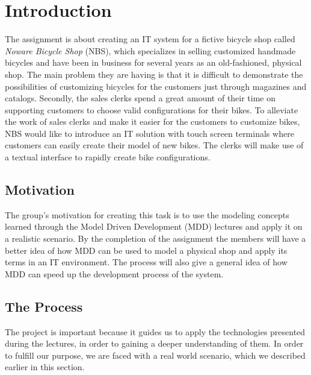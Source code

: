 \section{Introduction}
\label{sec.introduction}
\noindent The assignment is about creating an IT system for a fictive bicycle
shop called \emph{Noware Bicycle Shop} (NBS), which specializes in selling
customized handmade bicycles and have been in business for several years as an
old-fashioned, physical shop. The main problem they are having is that it is
difficult to demonstrate the possibilities of customizing bicycles for the
customers just through magazines and catalogs. Secondly, the sales clerks spend
a great amount of their time on supporting customers to choose valid
configurations for their bikes. To alleviate the work of sales clerks and make
it easier for the customers to customize bikes, NBS would like to introduce an
IT solution with touch screen terminals where customers can easily create their
model of new bikes. The clerks will make use of a textual interface to rapidly
create bike configurations.

\subsection{Motivation}
\noindent The group's motivation for creating this task is to use the modeling
concepts learned through the Model Driven Development (MDD) lectures and apply
it on a realistic scenario. By the completion of the assignment the members will
have a better idea of how MDD can be used to model a physical shop and apply its
terms in an IT environment.  The process will also give a general idea of how
MDD can speed up the development process of the system.

\subsection{The Process}
\noindent The project is important because it guides us to apply the
technologies presented during the lectures, in order to gaining a deeper
understanding of them. In order to fulfill our purpose, we are faced with a real
world scenario,
which we described earlier in this section.\\

